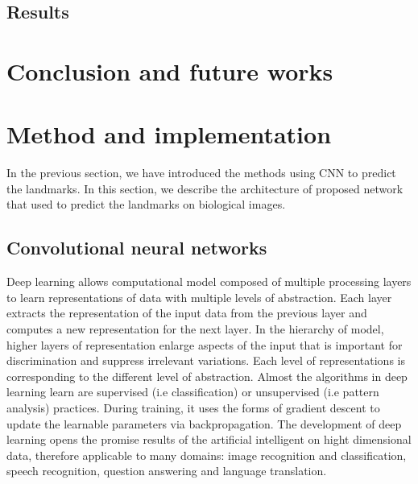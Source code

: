 \documentclass[conference]{IEEEtran}
\begin{document}
\subsection{Results}
\section{Conclusion and future works}

\section{Method and implementation}
\label{sec3}
In the previous section, we have introduced the methods using CNN to predict the landmarks. In this section, we describe the architecture of proposed network that used to predict the landmarks on biological images.
\subsection{Convolutional neural networks}
Deep learning allows computational model composed of multiple processing layers to learn representations of data with multiple levels of abstraction\cite{lecun2015deep}. Each layer extracts the representation of the input data from the previous layer and computes a new representation for the next layer. In the hierarchy of model, higher layers of representation enlarge aspects of the input that is important for discrimination and suppress irrelevant variations. Each level of representations is corresponding to the different level of abstraction. Almost the algorithms in deep learning learn are supervised (i.e classification) or unsupervised (i.e pattern analysis) practices. During training, it uses the forms of gradient descent to update the learnable parameters via backpropagation. The development of deep learning opens the promise results of the artificial intelligent on hight dimensional data, therefore applicable to many domains: image recognition and classification\cite{krizhevsky2012imagenet,ciregan2012multi,szegedy2015going}, speech recognition\cite{mikolov2011strategies,hinton2012deep,sainath2013deep}, question answering\cite{bordes2014question} and language translation\cite{sutskever2014sequence}\cite{jean2014using}.
\end{document}
